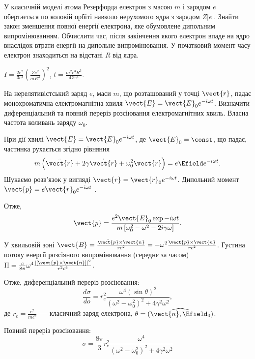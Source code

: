 \begin{problem}
У класичній моделі атома Резерфорда електрон з масою $m$ і зарядом $e$ обертається по коловій орбіті навколо нерухомого ядра з зарядом $Z|e|$. Знайти закон зменшення повної енергії електрона, яке обумовлене дипольним випромінюванням. Обчислити час, після закінчення якого електрон впаде на ядро внаслідок втрати енергії на дипольне випромінювання. У початковий момент часу електрон знаходиться на відстані $R$ від ядра.
\begin{solution}
	$I = \frac{2e^2}{3c^3} \left( \frac{Ze^2}{mR^2}\right)^2 $, $t = \frac{m^2c^3R^3}{4Ze^4}$.
\end{solution}
\end{problem}




\begin{problem}
На нерелятивістський заряд $e$, маси $m$, що розташований у точці $\vect{r}$, падає монохроматична електромагнітна хвиля $\vect{E} = \vect{E}_0e^{-i\omega t}$. Визначити диференціальний та повний переріз розсіювання електромагнітних хвиль. Власна частота коливань заряду $\omega_0$.
\begin{solution}
	При дії хвилі $\vect{E} = \vect{E}_0e^{-i\omega t}$, де $\vect{E}_0 = \const$, що падає, частинка рухається згідно рівняння
	\[
		m \left( \ddot{\vect{r}} + 2\gamma\dot{\vect{r}} + \omega_0^2\vect{r}\right) = e\Efield e^{-i\omega t}.
	\]
	Шукаємо розв’язок у вигляді $\vect{r}  = \vect{r}_0e^{-i\omega t}$. Дипольний момент $\vect{p}  = e\vect{r}_0e^{-i\omega t}$ .

	Отже,
	\[
		\vect{p} = \frac{e^2\vect{E}_0\exp{- i\omega t}}{m\left[ {\omega _0^2 - \omega ^2 - 2i\gamma \omega } \right]}.
	\]

	У хвильовій зоні $\vect{B} = \frac{\ddot{\vect{p}} \times \vect{n}}{rc^2} =  - \omega^2 \frac{\vect{p} \times \vect{n}}{rc^2}$.
	Густина потоку енергії розсіяного випромінювання (середнє за часом) $\Pi  = \frac{c}{8\pi}{\omega ^4}\frac{{\left| {\left[ {{\vect{p}} \times {\vect{n}}} \right]} \right|}^2}{{{r^2}{c^4}}}$.

	Отже, диференціальний переріз розсіювання:
	\[\frac{{d\sigma }}{{do}} = r_e^2\frac{{{\omega ^4}{{(\sin \theta )}^2}}}{{{{({\omega ^2} - \omega _0^2)}^2} + 4{\gamma ^2}{\omega ^2}}},
	\]
	де $r_e = \frac{e^2}{mc^2}$~--- класичний заряд електрона, $\theta  = (\widehat{\vect{n},\Efield_0})$.

	Повний переріз розсіювання:
	\[
		\sigma  = \frac{{8\pi }}{3}r_e^2\frac{{{\omega ^4}}}{{{{({\omega ^2} - \omega _0^2)}^2} + 4{\gamma ^2}{\omega ^2}}}
	\]
\end{solution}
\end{problem}

